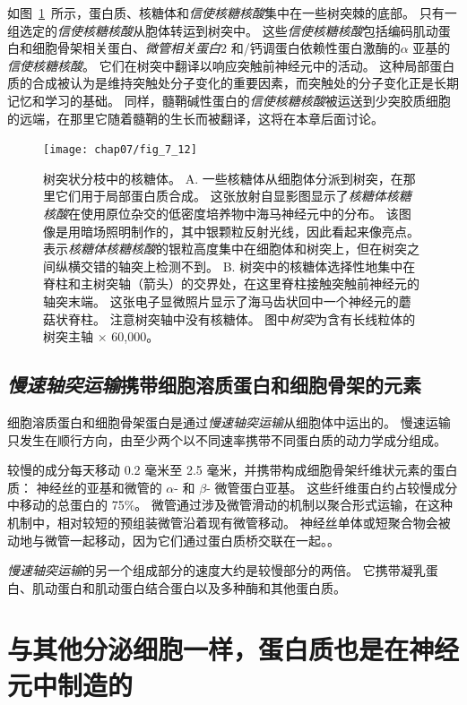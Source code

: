 如图~\ref{fig:7_12}~所示，蛋白质、核糖体和\textit{信使核糖核酸}集中在一些树突棘的底部。
只有一组选定的\textit{信使核糖核酸}从胞体转运到树突中。
这些\textit{信使核糖核酸}包括编码肌动蛋白和细胞骨架相关蛋白、\textit{微管相关蛋白}2 和/钙调蛋白依赖性蛋白激酶的$\alpha$ 亚基的\textit{信使核糖核酸}。
它们在树突中翻译以响应突触前神经元中的活动。
这种局部蛋白质的合成被认为是维持突触处分子变化的重要因素，而突触处的分子变化正是长期记忆和学习的基础。
同样，髓鞘碱性蛋白的\textit{信使核糖核酸}被运送到少突胶质细胞的远端，在那里它随着髓鞘的生长而被翻译，这将在本章后面讨论。


\begin{figure}[htbp]
	\centering
	\texttt{[image: chap07/fig\_7\_12]}
	\caption{树突状分枝中的核糖体。
		A. 一些核糖体从细胞体分派到树突，在那里它们用于局部蛋白质合成。
		这张放射自显影图显示了\textit{核糖体核糖核酸}在使用原位杂交的低密度培养物中海马神经元中的分布。
		该图像是用暗场照明制作的，其中银颗粒反射光线，因此看起来像亮点。
		表示\textit{核糖体核糖核酸}的银粒高度集中在细胞体和树突上，但在树突之间纵横交错的轴突上检测不到。
		B. 树突中的核糖体选择性地集中在脊柱和主树突轴（箭头）的交界处，在这里脊柱接触突触前神经元的轴突末端。
		这张电子显微照片显示了海马齿状回中一个神经元的蘑菇状脊柱。
		注意树突轴中没有核糖体。
		图中\textit{树突}为含有长线粒体的树突主轴 $\times$ 60,000。}
	\label{fig:7_12}
\end{figure}


\subsection{\textit{慢速轴突运输}携带细胞溶质蛋白和细胞骨架的元素}

细胞溶质蛋白和细胞骨架蛋白是通过\textit{慢速轴突运输}从细胞体中运出的。
慢速运输只发生在顺行方向，由至少两个以不同速率携带不同蛋白质的动力学成分组成。


较慢的成分每天移动 0.2 毫米至 2.5 毫米，并携带构成细胞骨架纤维状元素的蛋白质：
神经丝的亚基和微管的 $\alpha$- 和 $\beta$- 微管蛋白亚基。
这些纤维蛋白约占较慢成分中移动的总蛋白的 75\%。 
微管通过涉及微管滑动的机制以聚合形式运输，在这种机制中，相对较短的预组装微管沿着现有微管移动。
神经丝单体或短聚合物会被动地与微管一起移动，因为它们通过蛋白质桥交联在一起。。


\textit{慢速轴突运输}的另一个组成部分的速度大约是较慢部分的两倍。
它携带凝乳蛋白、肌动蛋白和肌动蛋白结合蛋白以及多种酶和其他蛋白质。



\section{与其他分泌细胞一样，蛋白质也是在神经元中制造的}

